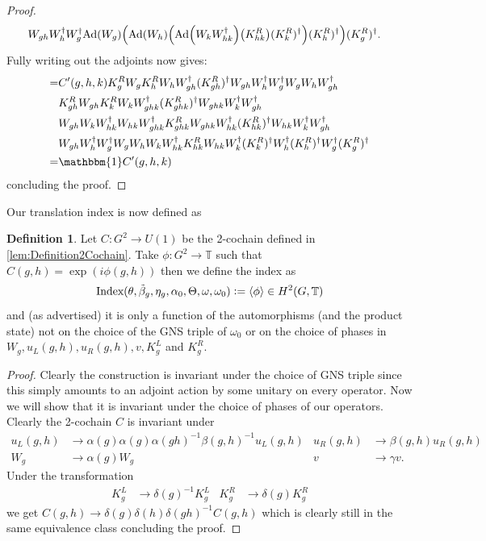 \documentclass[12pt,a4paper,twoside]{article}
\newcommand{\defeq}{\vcentcolon=}
\let\originalleft\left
\let\originalright\right
\renewcommand{\left}{\mathopen{}\mathclose\bgroup\originalleft}
\renewcommand{\right}{\aftergroup\egroup\originalright}
\newcommand{\TT}{\mathbb T}
\newcommand{\id}{\mathbbm{1}}
\newcommand{\Ad}[1]{\textrm{Ad}\left(#1\right)}
\theoremstyle{definition}
\newtheorem{definition}[theorem]{Definition}
\numberwithin{equation}{section}
\begin{document}
\begin{proof}
\begin{align}
		\nonumber
		&W_{gh}W_h^\dagger W_g^\dagger\Ad{W_g}\left(\Ad{W_h}\left(\Ad{W_kW_{hk}^\dagger}\left(K_{hk}^R\right)(K^R_k)^\dagger\right)(K^R_h)^\dagger\right)(K^R_g)^\dagger.
	\end{align}
	Fully writing out the adjoints now gives:
	\begin{align}
	=&C'(g,h,k)K_g^RW_gK_h^RW_hW_{gh}^\dagger (K_{gh}^R)^\dagger W_{gh}W_h^\dagger W_g^\dagger W_gW_hW_{gh}^\dagger \\
	\nonumber
	&K_{gh}^RW_{gh}K_k^RW_kW_{ghk}^\dagger(K_{ghk}^R)^\dagger W_{ghk}W_k^\dagger W_{gh}^\dagger  \\
	\nonumber
	&W_{gh}W_kW_{hk}^\dagger W_{hk}W_{ghk}^\dagger K^R_{ghk} W_{ghk}W_{hk}^\dagger(K^R_{hk})^{\dagger} W_{hk}W_k^\dagger W_{gh}^\dagger\\
	\nonumber
	&W_{gh}W_h^\dagger W_g^\dagger W_gW_h W_kW_{hk}^\dagger K_{hk}^RW_{hk}W_k^\dagger(K^R_k)^\dagger W_h^\dagger (K^R_h)^\dagger W_g^\dagger (K^R_g)^\dagger\\
	=&\id C'(g,h,k)
	\end{align}
	concluding the proof.
\end{proof}
Our translation index is now defined as
\begin{definition}
	Let $C:G^2\rightarrow U(1)$ be the 2-cochain defined in \ref{lem:Definition2Cochain}. Take $\phi:G^2\rightarrow\TT$ such that $C(g,h)=\exp(i\phi(g,h))$ then we define the index as
	\begin{equation}
	\textrm{Index}(\theta,\tilde{\beta}_g,\eta_g,\alpha_0,\Theta,\omega,\omega_0)\defeq\expval{\phi}\in H^2(G,\TT)
	\end{equation}
	and (as advertised) it is only a function of the automorphisms (and the product state) not on the choice of the GNS triple of $\omega_0$ or on the choice of phases in $W_g,u_L(g,h),u_R(g,h),v,K_g^L$ and $K_g^R$.
\end{definition}
\begin{proof}
	Clearly the construction is invariant under the choice of GNS triple since this simply amounts to an adjoint action by some unitary on every operator. Now we will show that it is invariant under the choice of phases of our operators. Clearly the 2-cochain $C$ is invariant under
	\begin{align}
		u_L(g,h)&\rightarrow \alpha(g)\alpha(g)\alpha(gh)^{-1}\beta(g,h)^{-1} u_L(g,h)&u_R(g,h)&\rightarrow \beta(g,h)u_R(g,h)\\
		W_g&\rightarrow\alpha(g)W_g&v&\rightarrow \gamma v.
	\end{align}
	Under the transformation
	\begin{align}
		K_g^L&\rightarrow \delta(g)^{-1}K_g^L&K_g^R&\rightarrow \delta(g)K_g^R
	\end{align}
	we get $C(g,h)\rightarrow \delta(g)\delta(h)\delta(gh)^{-1}C(g,h)$ which is clearly still in the same equivalence class concluding the proof.
\end{proof}
\end{document}
